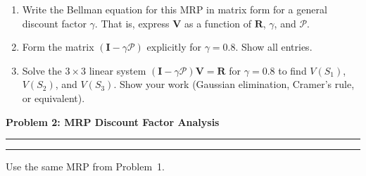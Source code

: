 \documentclass[12pt]{article}
\newcommand{\question}[1]{%
  \clearpage
  \vspace{0.5cm}
  {\noindent\normalsize \textbf{#1}}
  \vspace{0.2cm}
  \hrule
  \vspace{0.1cm}
  \hrule
  \vspace{0.3cm}
}
\begin{document}
\begin{enumerate}[label=(\alph*)]
\item Write the Bellman equation for this MRP in matrix form for a general discount factor $\gamma$. That is, express $\mathbf{V}$ as a function of $\mathbf{R}$, $\gamma$, and $\mathcal{P}$.

\vspace{4cm}

\item Form the matrix $(\mathbf{I} - \gamma \mathcal{P})$ explicitly for $\gamma = 0.8$. Show all entries.

\vspace{5cm}

\item Solve the $3 \times 3$ linear system $(\mathbf{I} - \gamma \mathcal{P})\mathbf{V} = \mathbf{R}$ for $\gamma = 0.8$ to find $V(S_1)$, $V(S_2)$, and $V(S_3)$. Show your work (Gaussian elimination, Cramer's rule, or equivalent).

\vspace{8cm}
\end{enumerate}


\question{Problem 2: MRP Discount Factor Analysis}\label{prob:discount}

Use the same MRP from Problem~1.
\end{document}
